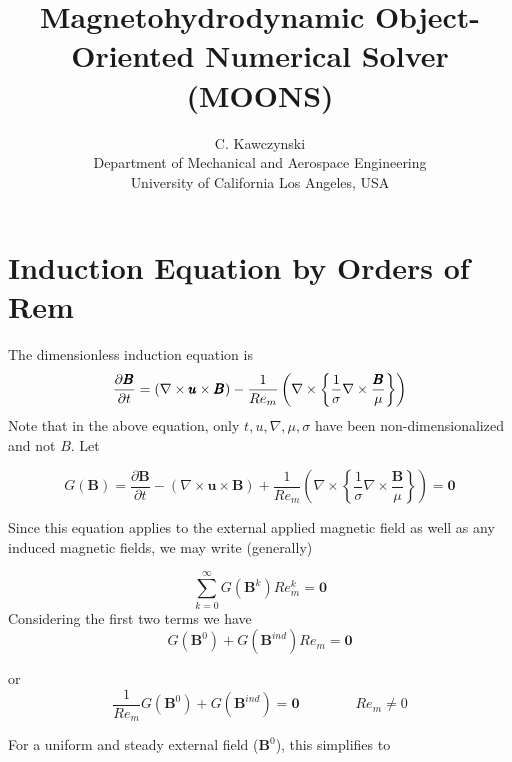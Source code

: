 \documentclass[11pt]{article}
\begin{document}
\doublespacing
\title{Magnetohydrodynamic Object-Oriented Numerical Solver (MOONS)}
\author{C. Kawczynski \\
Department of Mechanical and Aerospace Engineering \\
University of California Los Angeles, USA\\
}
\maketitle

\section{Induction Equation by Orders of Rem}
The dimensionless induction equation is
\begin{equation}
  \label{eq:ind}
  \frac{\partial \pmb{B}}{\partial t} 
  =
  (\nabla \times \pmb{u} \times \pmb{B})
  - \\
  \frac{1}{Re_m}
  \left(
  \nabla \times
  \left\{
  \frac{1}{\sigma}
  \nabla \times
  \frac{\pmb{B}}{\mu}
  \right\}
  \right)
\end{equation}
Note that in the above equation, only $t,u,\nabla , \mu, \sigma$ have been non-dimensionalized and not $B$. Let

\begin{equation}
  G(\pmb{B})
  =
  \frac{\partial \pmb{B}}{\partial t} 
  -
  (\nabla \times \pmb{u} \times \pmb{B})
  +
  \frac{1}{Re_m}
  \left(
  \nabla \times
  \left\{
  \frac{1}{\sigma}
  \nabla \times
  \frac{\pmb{B}}{\mu}
  \right\}
  \right)
  =
  \pmb{0}
\end{equation}

Since this equation applies to the external applied magnetic field as well as any induced magnetic fields, we may write (generally)

\begin{equation}
	\sum_{k=0}^{\infty} G(\pmb{B}^k)
  Re_m^k
	=
	\pmb{0}
\end{equation}
Considering the first two terms we have
\begin{equation}
  G(\pmb{B}^0)
  +
  G(\pmb{B}^{ind}) Re_m
  =
  \pmb{0}
\end{equation}

or
\begin{equation}
  \frac{1}{Re_m}
  G(\pmb{B}^0)
  +
  G(\pmb{B}^{ind})
  =
  \pmb{0}
  \qquad \qquad
  Re_m \ne 0
\end{equation}

For a uniform and steady external field ($\pmb{B}^0$), this simplifies to
\end{document}
